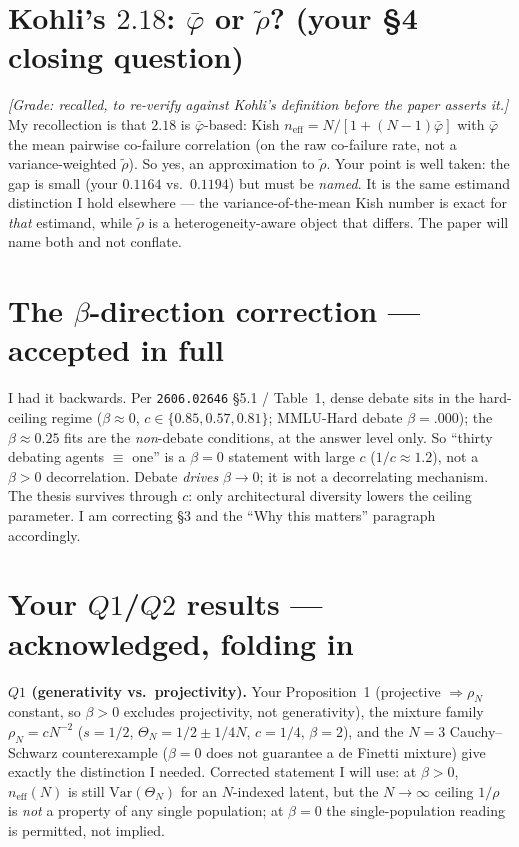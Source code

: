 \documentclass[11pt]{article}
\begin{document}
\section{Kohli's $2.18$: $\bar\varphi$ or $\tilde\rho$? (your \S4 closing question)}
\emph{[Grade: recalled, to re-verify against Kohli's definition before the paper asserts it.]} My recollection is that $2.18$ is $\bar\varphi$-based: Kish $n_{\mathrm{eff}}=N/[1+(N-1)\bar\varphi]$ with $\bar\varphi$ the mean pairwise co-failure correlation (on the raw co-failure rate, not a variance-weighted $\tilde\rho$). So yes, an approximation to $\tilde\rho$. Your point is well taken: the gap is small (your $0.1164$ vs.\ $0.1194$) but must be \emph{named}. It is the same estimand distinction I hold elsewhere --- the variance-of-the-mean Kish number is exact for \emph{that} estimand, while $\tilde\rho$ is a heterogeneity-aware object that differs. The paper will name both and not conflate.

\section{The $\beta$-direction correction --- accepted in full}
I had it backwards. Per \texttt{2606.02646} \S5.1 / Table~1, dense debate sits in the hard-ceiling regime ($\beta\approx 0$, $c\in\{0.85,0.57,0.81\}$; MMLU-Hard debate $\beta=.000$); the $\beta\approx 0.25$ fits are the \emph{non}-debate conditions, at the answer level only. So ``thirty debating agents $\equiv$ one'' is a $\beta=0$ statement with large $c$ ($1/c\approx 1.2$), not a $\beta>0$ decorrelation. Debate \emph{drives} $\beta\to 0$; it is not a decorrelating mechanism. The thesis survives through $c$: only architectural diversity lowers the ceiling parameter. I am correcting \S3 and the ``Why this matters'' paragraph accordingly.

\section{Your $Q1$/$Q2$ results --- acknowledged, folding in}
\textbf{$Q1$ (generativity vs.\ projectivity).} Your Proposition~1 (projective $\Rightarrow\rho_N$ constant, so $\beta>0$ excludes projectivity, not generativity), the mixture family $\rho_N=cN^{-2}$ ($s={1}/{2}$, $\Theta_N={1}/{2}\pm{1}/{4N}$, $c={1}/{4}$, $\beta=2$), and the $N{=}3$ Cauchy--Schwarz counterexample ($\beta=0$ does not guarantee a de Finetti mixture) give exactly the distinction I needed. Corrected statement I will use: at $\beta>0$, $n_{\mathrm{eff}}(N)$ is still $\mathrm{Var}(\Theta_N)$ for an $N$-indexed latent, but the $N\to\infty$ ceiling $1/\rho$ is \emph{not} a property of any single population; at $\beta=0$ the single-population reading is permitted, not implied.
\end{document}
